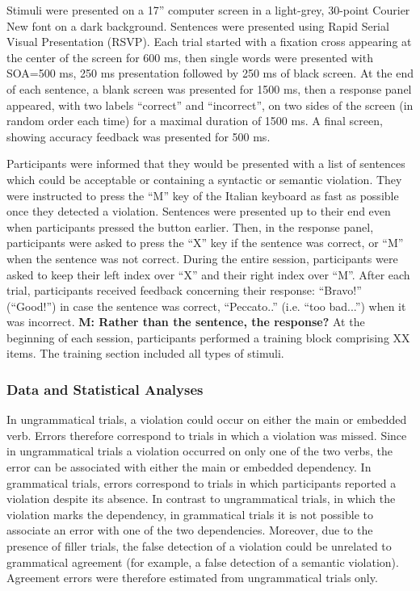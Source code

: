 Stimuli were presented on a 17” computer screen in a light-grey, 30-point Courier New font on a dark background. Sentences were presented using Rapid Serial Visual Presentation (RSVP). Each trial started with a fixation cross appearing at the center of the screen for 600 ms, then single words were presented with SOA=500 ms, 250 ms presentation followed by 250 ms of black screen. At the end of each sentence, a blank screen was presented for 1500 ms, then a response panel appeared, with two labels “correct” and “incorrect”, on two sides of the screen (in random order each time) for a maximal duration of 1500 ms. A final screen, showing accuracy feedback was presented for 500 ms.

Participants were informed that they would be presented with a list of sentences which could be acceptable or containing a syntactic or semantic violation. They were instructed to press the “M” key of the Italian keyboard as fast as possible once they detected a violation. Sentences were presented up to their end even when participants pressed the button earlier. Then, in the response panel, participants were asked to press the “X” key if the sentence was correct, or “M” when the sentence was not correct. During the entire session, participants were asked to keep their left index over “X” and their right index over “M”. After each trial, participants received feedback concerning their response: ``Bravo!'' (``Good!'') in  case the sentence was correct, ``Peccato..'' (i.e. ``too bad...'') when it was incorrect. \textbf{M: Rather than the sentence, the response?} At the beginning of each session, participants performed a training block comprising XX items. The training section included all types of stimuli.

\subsubsection{Data and Statistical Analyses}
In ungrammatical trials, a violation could occur on either the main or embedded verb. Errors therefore correspond to trials in which a violation was missed. Since in ungrammatical trials a violation occurred on only one of the two verbs, the error can be associated with either the main or embedded dependency. In grammatical trials, errors correspond to trials in which participants reported a violation despite its absence. In contrast to ungrammatical trials, in which the violation marks the dependency, in grammatical trials it is not possible to associate an error with one of the two dependencies. Moreover, due to the presence of filler trials, the false detection of a violation could be unrelated to grammatical agreement (for example, a false detection of a semantic violation). Agreement errors were therefore estimated from ungrammatical trials only.

